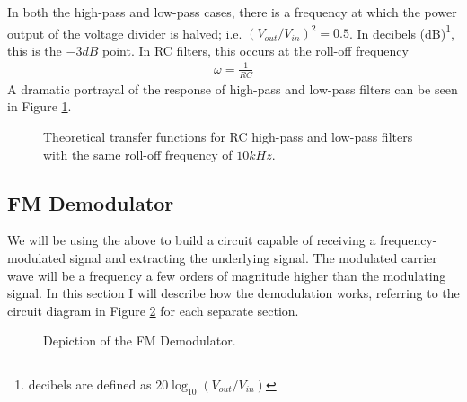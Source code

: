 \documentclass[12pt]{article}
\begin{document}
In both the high-pass and low-pass cases, there is a frequency at which the power output of the voltage divider is halved; i.e. $(V_{out}/V_{in})^2 = 0.5$. In decibels (dB)\footnote{decibels are defined as $20\log_{10}{(V_{out}/V_{in})}$}, this is the $-3dB$ point. In RC filters, this occurs at the roll-off frequency
\begin{eqnarray}
\omega = \frac{1}{RC}\label{eq:rolloff}
\end{eqnarray}
A dramatic portrayal of the response of high-pass and low-pass filters can be seen in Figure \ref{fig:highandlowpass}.
\begin{figure}[H]
\caption{Theoretical transfer functions for RC high-pass and low-pass filters with the same roll-off frequency of $10kHz$.}
\label{fig:highandlowpass}
\end{figure}
\subsection*{FM Demodulator}
We will be using the above to build a circuit capable of receiving a frequency-modulated signal and extracting the underlying signal. The modulated carrier wave will be a frequency a few orders of magnitude higher than the modulating signal. In this section I will describe how the demodulation works, referring to the circuit diagram in Figure \ref{fig:fmdemoddiagram} for each separate section.
\begin{figure}[H]
\caption{Depiction of the FM Demodulator.}
\label{fig:fmdemoddiagram}
\end{figure}
\end{document}
